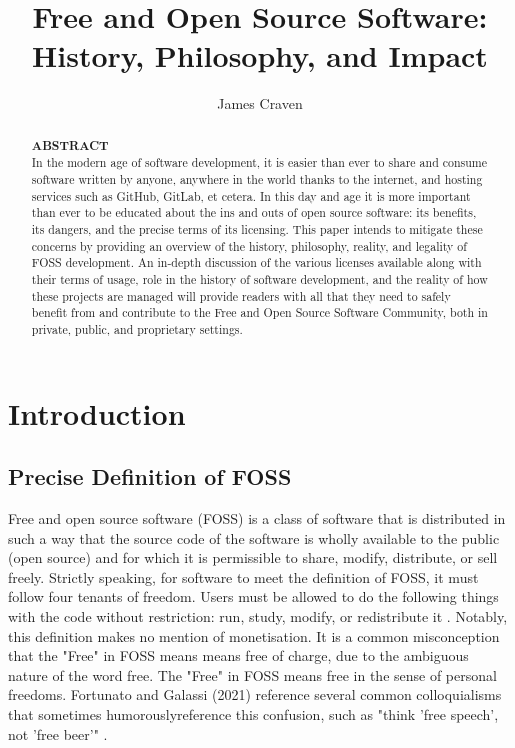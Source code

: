 \documentclass[manuscript,screen,nonacm,12pt]{acmart}
\begin{document}
\title{Free and Open Source Software: History, Philosophy, and Impact}

\author{James Craven}

\begin{abstract}
{\large \textbf{ABSTRACT}} \\
In the modern age of software development, it is easier than ever to share and
consume software written by anyone, anywhere in the world thanks to the
internet, and hosting services such as GitHub, GitLab, et cetera. In this day
and age it is more important than ever to be educated about the ins and outs of
open source software: its benefits, its dangers, and the precise terms of its
licensing. This paper intends to mitigate these concerns by providing an
overview of the history, philosophy, reality, and legality of FOSS development.
An in-depth discussion of the various licenses available along with their terms
of usage, role in the history of software development, and the reality of how
these projects are managed will provide readers with all that they need to
safely benefit from and contribute to the Free and Open Source Software
Community, both in private, public, and proprietary settings.
\end{abstract}

\maketitle

\section{Introduction}
\subsection{Precise Definition of FOSS}
Free and open source software (FOSS) is a class of software that is distributed
in such a way that the source code of the software is wholly available to the
public (open source) and for which it is permissible to share, modify,
distribute, or sell freely. Strictly speaking, for software to meet the
definition of FOSS, it must follow four tenants of freedom. Users must be
allowed to do the following things with the code without restriction: run,
study, modify, or redistribute it \cite{Fortunato2021}. Notably, this definition
makes no mention of monetisation. It is a common misconception that the "Free"
in FOSS means means free of charge, due to the ambiguous nature of the word
free. The "Free" in FOSS means free in the sense of personal freedoms. Fortunato
and Galassi (2021) reference several common colloquialisms that\textemdash
sometimes humorously\textemdash reference this confusion, such as "think 'free
speech', not 'free beer'" \cite{Fortunato2021}.
\end{document}
